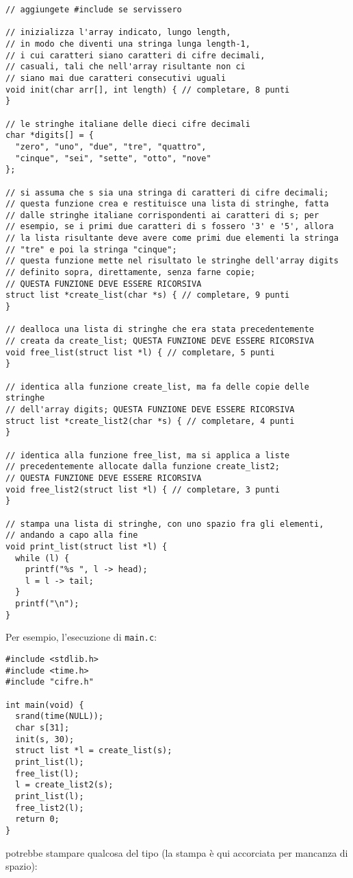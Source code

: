 \documentclass[12pt]{article}
\begin{document}
\begin{center}
  \begin{lstlisting}[language=myC]
// aggiungete #include se servissero

// inizializza l'array indicato, lungo length,
// in modo che diventi una stringa lunga length-1,
// i cui caratteri siano caratteri di cifre decimali,
// casuali, tali che nell'array risultante non ci
// siano mai due caratteri consecutivi uguali
void init(char arr[], int length) { // completare, 8 punti
}

// le stringhe italiane delle dieci cifre decimali
char *digits[] = {
  "zero", "uno", "due", "tre", "quattro",
  "cinque", "sei", "sette", "otto", "nove"
};

// si assuma che s sia una stringa di caratteri di cifre decimali;
// questa funzione crea e restituisce una lista di stringhe, fatta
// dalle stringhe italiane corrispondenti ai caratteri di s; per
// esempio, se i primi due caratteri di s fossero '3' e '5', allora
// la lista risultante deve avere come primi due elementi la stringa
// "tre" e poi la stringa "cinque";
// questa funzione mette nel risultato le stringhe dell'array digits
// definito sopra, direttamente, senza farne copie;
// QUESTA FUNZIONE DEVE ESSERE RICORSIVA
struct list *create_list(char *s) { // completare, 9 punti
}

// dealloca una lista di stringhe che era stata precedentemente
// creata da create_list; QUESTA FUNZIONE DEVE ESSERE RICORSIVA
void free_list(struct list *l) { // completare, 5 punti
}

// identica alla funzione create_list, ma fa delle copie delle stringhe
// dell'array digits; QUESTA FUNZIONE DEVE ESSERE RICORSIVA
struct list *create_list2(char *s) { // completare, 4 punti
}

// identica alla funzione free_list, ma si applica a liste
// precedentemente allocate dalla funzione create_list2;
// QUESTA FUNZIONE DEVE ESSERE RICORSIVA
void free_list2(struct list *l) { // completare, 3 punti
}

// stampa una lista di stringhe, con uno spazio fra gli elementi,
// andando a capo alla fine
void print_list(struct list *l) {
  while (l) {
    printf("%s ", l -> head);
    l = l -> tail;
  }
  printf("\n");
}
  \end{lstlisting}
\end{center}

Per esempio, l'esecuzione di \texttt{main.c}:
%
\begin{center}
  \begin{lstlisting}[language=myC]
#include <stdlib.h>
#include <time.h>
#include "cifre.h"

int main(void) {
  srand(time(NULL));
  char s[31];
  init(s, 30);
  struct list *l = create_list(s);
  print_list(l);
  free_list(l);
  l = create_list2(s);
  print_list(l);
  free_list2(l);
  return 0;
}
  \end{lstlisting}
\end{center}
%
potrebbe stampare qualcosa del tipo (la stampa \`e qui accorciata per mancanza di spazio):
\end{document}
